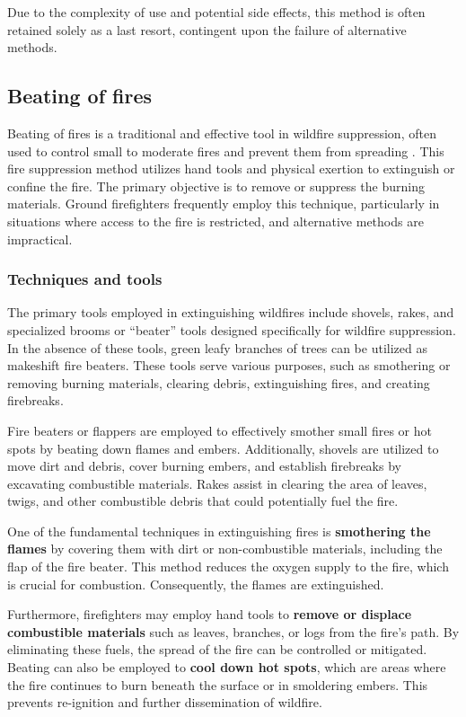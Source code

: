 \documentclass[
  12 pt,
]{Nemilov}
\begin{document}
Due to the complexity of use and potential side effects, this method is often retained solely as a last resort, contingent upon the failure of alternative methods.

\subsection{Beating of fires}\label{beating-of-fires}

Beating of fires is a traditional and effective tool in wildfire suppression, often used to control small to moderate fires and prevent them from spreading \citep{bibby1978conservation}. This fire suppression method utilizes hand tools and physical exertion to extinguish or confine the fire. The primary objective is to remove or suppress the burning materials. Ground firefighters frequently employ this technique, particularly in situations where access to the fire is restricted, and alternative methods are impractical.

\subsubsection{Techniques and tools}\label{techniques-and-tools}

The primary tools employed in extinguishing wildfires include shovels, rakes, and specialized brooms or ``beater'' tools designed specifically for wildfire suppression. In the absence of these tools, green leafy branches of trees can be utilized as makeshift fire beaters. These tools serve various purposes, such as smothering or removing burning materials, clearing debris, extinguishing fires, and creating firebreaks.

Fire beaters or flappers are employed to effectively smother small fires or hot spots by beating down flames and embers. Additionally, shovels are utilized to move dirt and debris, cover burning embers, and establish firebreaks by excavating combustible materials. Rakes assist in clearing the area of leaves, twigs, and other combustible debris that could potentially fuel the fire.

One of the fundamental techniques in extinguishing fires is \textbf{smothering the flames} by covering them with dirt or non-combustible materials, including the flap of the fire beater. This method reduces the oxygen supply to the fire, which is crucial for combustion. Consequently, the flames are extinguished.

Furthermore, firefighters may employ hand tools to \textbf{remove or displace combustible materials} such as leaves, branches, or logs from the fire's path. By eliminating these fuels, the spread of the fire can be controlled or mitigated. Beating can also be employed to \textbf{cool down hot spots}, which are areas where the fire continues to burn beneath the surface or in smoldering embers. This prevents re-ignition and further dissemination of wildfire.
\end{document}
